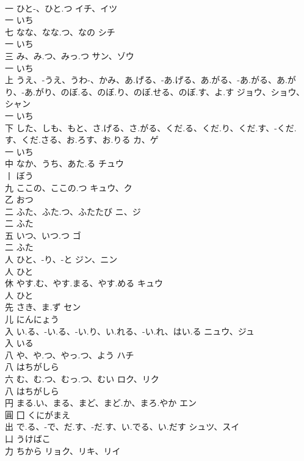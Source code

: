 \documentclass[8pt]{extreport}
\begin{document}
\begin{CJK}{UTF8}{min}
\\	一	ひと-、ひと.つ	イチ、イツ	
\\	一		いち		
\\	七	なな、なな.つ、なの	シチ	
\\	一		いち		
\\	三	み、み.つ、みっ.つ	サン、ゾウ	
\\	一		いち		
\\	上	うえ、-うえ、うわ-、かみ、あ.げる、-あ.げる、あ.がる、-あ.がる、あ.がり、-あ.がり、のぼ.る、のぼ.り、のぼ.せる、のぼ.す、よ.す	ジョウ、ショウ、シャン	
\\	一		いち		
\\	下	した、しも、もと、さ.げる、さ.がる、くだ.る、くだ.り、くだ.す、-くだ.す、くだ.さる、お.ろす、お.りる	カ、ゲ	
\\	一		いち		
\\	中	なか、うち、あた.る	チュウ	
\\	丨		ぼう		
\\	九	ここの、ここの.つ	キュウ、ク	
\\	乙		おつ		
\\	二	ふた、ふた.つ、ふたたび	ニ、ジ	
\\	二		ふた		
\\	五	いつ、いつ.つ	ゴ	
\\	二		ふた		
\\	人	ひと、-り、-と	ジン、ニン	
\\	人		ひと		
\\	休	やす.む、やす.まる、やす.める	キュウ	
\\	人		ひと		
\\	先	さき、ま.ず	セン	
\\	儿		にんにょう		
\\	入	い.る、-い.る、-い.り、い.れる、-い.れ、はい.る	ニュウ、ジュ	
\\	入		いる		
\\	八	や、や.つ、やっ.つ、よう	ハチ	
\\	八		はちがしら		
\\	六	む、む.つ、むっ.つ、むい	ロク、リク	
\\	八		はちがしら		
\\	円	まる.い、まる、まど、まど.か、まろ.やか	エン	
\\	圓	囗		くにがまえ		
\\	出	で.る、-で、だ.す、-だ.す、い.でる、い.だす	シュツ、スイ	
\\	凵		うけばこ		
\\	力	ちから	リョク、リキ、リイ	

\end{CJK}
\end{document}
